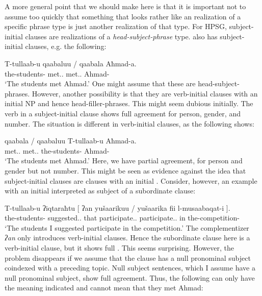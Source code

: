 \documentclass[output=paper]{langsci/langscibook}
\begin{document}
A more general point that we should make here is that it is important not to
assume too quickly that something that looks rather like an 
realization of a specific phrase type is just another realization of that type.
For \gls{HPSG},  subject-initial clauses are realizations of a
\emph{head-subject-phrase} type.  also has subject-initial clauses,
e.g. the following:

\ea\label{ex:key:4.26}
    \sn\gll T-tullaab-u qaabaluu {/ } \llap{*}qaabala Aħmad-a.\\
            the-students-\Nom{} met.\Tpl.\M{} {} met.\Tsg.\M{} Ahmad-\Acc{}\\
    \glt    \enquote*{The students met Ahmad.}
\z
%
One might assume that these are head-subject-phrases. However, another
possibility is that they are verb-initial clauses with an initial NP  and
hence head-filler-phrases. This might seem dubious initially. The verb in a
subject-initial clause shows full agreement for person, gender, and
number. The
situation is different in verb-initial clauses, as the following shows:

\ea\label{ex:key:4.27}
    \sn\gll qaabala {/ } \llap{*}qaabaluu T-tullaab-u Aħmad-a.\\
            met.\Tsg.\M{} {} met.\Tpl.\M{} the-students-\Nom{} Ahmad-\Acc{}\\
    \glt    \enquote*{The students met Ahmad.}
\z
%
Here, we have partial agreement,  for person and gender but not
number. This might be seen as evidence against the idea that subject-initial
clauses are clauses with an initial . Consider, however, an example with
an initial  interpreted as subject of a subordinate clause:

\ea\label{ex:key:4.28}
    \sn\gll T-tullaab-u ʔiqtaraħtu {[} ʔan yušaarikuu {/ } \llap{*}yušaarika fii l-musaabaqat-i ].\\
            the-students-\Nom{} suggested.\Fsg.\M{} {} that participate.\Tpl.\M{} {} participate.\Tsg.\M{} in the-competition-\Gen{}\\
    \glt    \enquote*{The students I suggested participate in the competition.}
\z
%
The complementizer \emph{ʔan} only introduces verb-initial clauses. Hence the
subordinate clause here is a verb-initial clause, but it shows full
.  This seems surprising. However, the problem disappears if we
assume that the clause has a null pronominal subject coindexed with a preceding
topic. Null subject sentences, which I assume have a null pronominal subject,
show full agreement. Thus, the following can only have the meaning indicated
and cannot mean that they met Ahmad:
\end{document}
